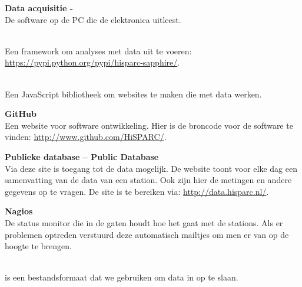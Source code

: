 \textbf{Data acquisitie - \hisparc\daq} \\
De software op de \hisparc PC die de \hisparc elektronica uitleest.

\textbf{\sapphire} \\
Een \python framework om analyses met \hisparc data uit te voeren:
\url{https://pypi.python.org/pypi/hisparc-sapphire/}.

\textbf{\jsparc} \\
Een JavaScript bibliotheek om websites te maken die met \hisparc data
werken.

\textbf{GitHub} \\
Een website voor software ontwikkeling. Hier is de broncode voor de
\hisparc software te vinden: \url{http://www.github.com/HiSPARC/}.

\textbf{Publieke database -- Public Database} \\
Via deze site is toegang tot de \hisparc data mogelijk. De website toont
voor elke dag een samenvatting van de data van een station. Ook zijn
hier de metingen en andere gegevens op te vragen. De site is te bereiken
via: \url{http://data.hisparc.nl/}.

\textbf{Nagios} \\
De status monitor die in de gaten houdt hoe het gaat met de stations.
Als er problemen optreden verstuurd deze automatisch mailtjes om men er
van op de hoogte te brengen.

\textbf{\hdf} \\
\hdf is een bestandsformaat dat we gebruiken om data in op te slaan.


